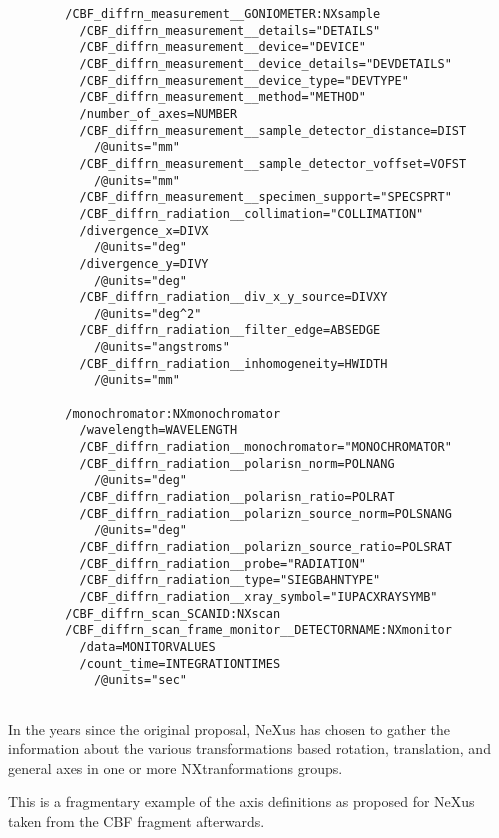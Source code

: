 \documentclass[11pt]{article}
\begin{document}
{\begin{verbatim}
        /CBF_diffrn_measurement__GONIOMETER:NXsample
          /CBF_diffrn_measurement__details="DETAILS"
          /CBF_diffrn_measurement__device="DEVICE"
          /CBF_diffrn_measurement__device_details="DEVDETAILS"
          /CBF_diffrn_measurement__device_type="DEVTYPE"
          /CBF_diffrn_measurement__method="METHOD"
          /number_of_axes=NUMBER
          /CBF_diffrn_measurement__sample_detector_distance=DIST 
            /@units="mm"
          /CBF_diffrn_measurement__sample_detector_voffset=VOFST 
            /@units="mm"
          /CBF_diffrn_measurement__specimen_support="SPECSPRT"
          /CBF_diffrn_radiation__collimation="COLLIMATION"
          /divergence_x=DIVX
            /@units="deg"
          /divergence_y=DIVY
            /@units="deg"
          /CBF_diffrn_radiation__div_x_y_source=DIVXY 
            /@units="deg^2"
          /CBF_diffrn_radiation__filter_edge=ABSEDGE 
            /@units="angstroms"
          /CBF_diffrn_radiation__inhomogeneity=HWIDTH 
            /@units="mm"
            
        /monochromator:NXmonochromator 
          /wavelength=WAVELENGTH
          /CBF_diffrn_radiation__monochromator="MONOCHROMATOR" 
          /CBF_diffrn_radiation__polarisn_norm=POLNANG 
            /@units="deg"
          /CBF_diffrn_radiation__polarisn_ratio=POLRAT
          /CBF_diffrn_radiation__polarizn_source_norm=POLSNANG
            /@units="deg"
          /CBF_diffrn_radiation__polarizn_source_ratio=POLSRAT
          /CBF_diffrn_radiation__probe="RADIATION"
          /CBF_diffrn_radiation__type="SIEGBAHNTYPE"
          /CBF_diffrn_radiation__xray_symbol="IUPACXRAYSYMB"
        /CBF_diffrn_scan_SCANID:NXscan
        /CBF_diffrn_scan_frame_monitor__DETECTORNAME:NXmonitor
          /data=MONITORVALUES
          /count_time=INTEGRATIONTIMES
            /@units="sec"
                
\end{verbatim}}

In the years since the original proposal, NeXus has chosen to gather
the information about the various transformations based rotation,
translation, and general axes in one or more NXtranformations groups.

This is a fragmentary example of the axis definitions as proposed for
NeXus taken from the CBF fragment afterwards.
\end{document}
